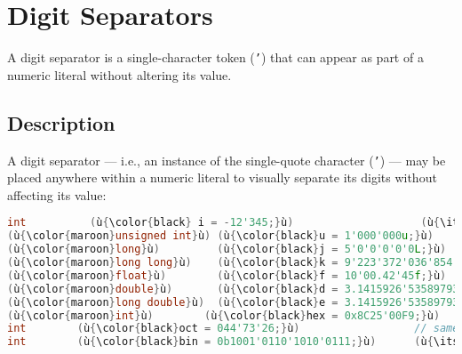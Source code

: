 \newpage
\section[Digit Separators]{Digit Separators}
\label{digitseparator} %
\label{digit-separators} %


A digit separator is a single-character token (\texttt{'}) that can appear as part of a
numeric literal without altering its value.

\subsection[Description]{Description}\label{description}

A digit separator --- i.e., an instance of the single-quote
character (\texttt{'}) --- may be placed anywhere within a numeric
literal to visually separate its digits without affecting its value:


\begin{lstlisting}[language=C++]
int          (ù{\color{black} i = -12'345;}ù)                    (ù{\itshape\color{skyblue}// same as}ù) (ù{\codeincomments{-12345}}ù)
(ù{\color{maroon}unsigned int}ù) (ù{\color{black}u = 1'000'000u;}ù)                 (ù{\itshape\color{skyblue}// same as}ù) (ù{\codeincomments{1000000u}}ù)
(ù{\color{maroon}long}ù)         (ù{\color{black}j = 5'0'0'0'0'0L;}ù)               // same as (ù{\codeincomments{500000L}}ù)
(ù{\color{maroon}long long}ù)    (ù{\color{black}k = 9'223'372'036'854'775'807;}ù)  // same as (ù{\codeincomments{9223372036854775807}}ù)
(ù{\color{maroon}float}ù)        (ù{\color{black}f = 10'00.42'45f;}ù)               // same as (ù{\codeincomments{1000.4245f}}ù)
(ù{\color{maroon}double}ù)       (ù{\color{black}d = 3.1415926'53589793;}ù)         (ù{\itshape\color{skyblue}// same as}ù) (ù{\codeincomments{3.141592653589793}}ù)
(ù{\color{maroon}long double}ù)  (ù{\color{black}e = 3.1415926'53589793'23846;}ù)   (ù{\itshape\color{skyblue}// same as}ù) (ù{\codeincomments{3.14159265358979323846}}ù)
(ù{\color{maroon}int}ù)        (ù{\color{black}hex = 0x8C25'00F9;}ù)                // same as (ù{\codeincomments{0x8C2500F9}}ù)
int        (ù{\color{black}oct = 044'73'26;}ù)                  // same as (ù{\codeincomments{0447326}}ù)
int        (ù{\color{black}bin = 0b1001'0110'1010'0111;}ù)      (ù{\itshape\color{skyblue}// same as}ù) (ù{\codeincomments{0b1001011000110001}}ù)
\end{lstlisting}

